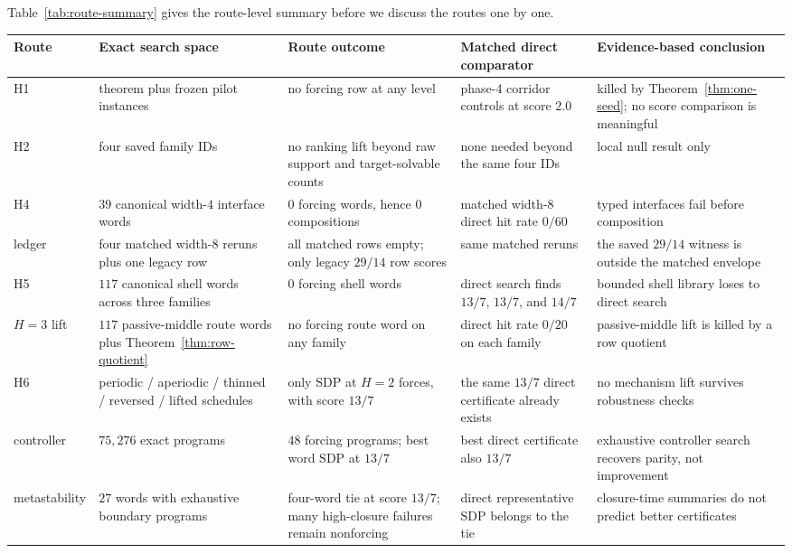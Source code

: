 \documentclass[11pt]{article}
\theoremstyle{definition}
\begin{document}
Table~\ref{tab:route-summary} gives the route-level summary before we discuss the routes one by one.

\begin{table}[H]
\centering
\small
\begin{tabular}{>{\raggedright\arraybackslash}p{2.0cm} >{\raggedright\arraybackslash}p{2.1cm} >{\raggedright\arraybackslash}p{2.6cm} >{\raggedright\arraybackslash}p{2.5cm} >{\raggedright\arraybackslash}p{3.2cm}}
\toprule
Route & Exact search space & Route outcome & Matched direct comparator & Evidence-based conclusion \\
\midrule
\textsc{H1} & theorem plus frozen pilot instances & no forcing row at any level & phase-4 corridor controls at score $2.0$ & killed by Theorem~\ref{thm:one-seed}; no score comparison is meaningful \\
\textsc{H2} & four saved family IDs & no ranking lift beyond raw support and target-solvable counts & none needed beyond the same four IDs & local null result only \\
\textsc{H4} & $39$ canonical width-$4$ interface words & $0$ forcing words, hence $0$ compositions & matched width-$8$ direct hit rate $0/60$ & typed interfaces fail before composition \\
ledger & four matched width-$8$ reruns plus one legacy row & all matched rows empty; only legacy $29/14$ row scores & same matched reruns & the saved $29/14$ witness is outside the matched envelope \\
\textsc{H5} & $117$ canonical shell words across three families & $0$ forcing shell words & direct search finds $13/7$, $13/7$, and $14/7$ & bounded shell library loses to direct search \\
$H=3$ lift & $117$ passive-middle route words plus Theorem~\ref{thm:row-quotient} & no forcing route word on any family & direct hit rate $0/20$ on each family & passive-middle lift is killed by a row quotient \\
\textsc{H6} & periodic / aperiodic / thinned / reversed / lifted schedules & only $\mathrm{SDP}$ at $H=2$ forces, with score $13/7$ & the same $13/7$ direct certificate already exists & no mechanism lift survives robustness checks \\
controller & $75{,}276$ exact programs & $48$ forcing programs; best word $\mathrm{SDP}$ at $13/7$ & best direct certificate also $13/7$ & exhaustive controller search recovers parity, not improvement \\
metastability & $27$ words with exhaustive boundary programs & four-word tie at score $13/7$; many high-closure failures remain nonforcing & direct representative $\mathrm{SDP}$ belongs to the tie & closure-time summaries do not predict better certificates \\

\end{tabular}
\end{table}
\end{document}
